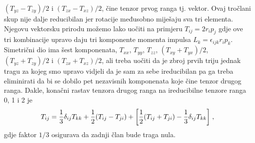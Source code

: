 $(T_{yz}-T_{zy})/2$ i $(T_{zx} - T_{xz})/2$, čine tenzor
prvog ranga tj. vektor.
Ovaj tročlani skup nije dalje reducibilan jer rotacije međusobno
miješaju sva tri elementa. Njegovu vektorsku prirodu možemo
lako uočiti na primjeru $T_{ij} = 2 r_i p_j$ gdje ove tri
kombinacije upravo daju tri komponente momenta impulsa 
$L_k = \epsilon_{ijk} r_i p_k$.
Simetrični dio ima šest komponenata, $T_{xx}$, $T_{yy}$, $T_{zz}$,
$(T_{xy}+T_{yx})/2$, $(T_{yz}+T_{zy})/2$ i $(T_{zx} + T_{xz})/2$, 
ali treba uočiti da je zbroj prvih triju jednak tragu za kojeg
smo upravo vidjeli da je sam za sebe ireducibilan 
pa ga treba eliminirati da bi se dobilo pet
nezavisnih komponenata koje čine tenzor drugog ranga.
Dakle, konačni rastav tenzora drugog ranga na
ireducibilne tenzore ranga 0, 1 i 2 je
\begin{equation}
T_{ij} = \frac{1}{3}\delta_{ij}T_{kk} +
  \frac{1}{2} (T_{ij} - T_{ji}) + 
 \bigg[\frac{1}{2} (T_{ij} + T_{ji}) - \frac{1}{3}\delta_{ij}T_{kk} \bigg] \;,
 \label{eq:Tijrastav}
\end{equation}
gdje faktor $1/3$ osigurava da zadnji član bude traga nula.

